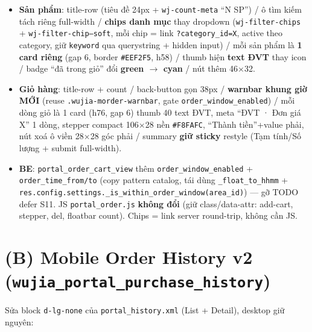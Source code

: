 \begin{itemize}
  \item \textbf{Sản phẩm}: title-row (tiêu đề 24px + \texttt{wj-count-meta} ``N SP'') / ô tìm kiếm
        tách riêng full-width / \textbf{chips danh mục} thay dropdown (\texttt{wj-filter-chips} +
        \texttt{wj-filter-chip--soft}, mỗi chip = link \texttt{?category\_id=X}, active theo
        category, giữ \texttt{keyword} qua querystring + hidden input) / mỗi sản phẩm là
        \textbf{1 card riêng} (gap 6, border \texttt{\#EEF2F5}, h58) / thumb hiện \textbf{text ĐVT}
        thay icon / badge ``đã trong giỏ'' đổi \textbf{green \(\rightarrow\) cyan} / nút thêm 46×32.
  \item \textbf{Giỏ hàng}: title-row + count / back-button gọn 38px / \textbf{warnbar khung giờ MỚI}
        (reuse \texttt{.wujia-morder-warnbar}, gate \texttt{order\_window\_enabled}) / mỗi dòng giỏ
        là 1 card (h76, gap 6) thumb 40 text ĐVT, meta ``ĐVT · Đơn giá X'' 1 dòng, stepper compact
        106×28 nền \texttt{\#F8FAFC}, ``Thành tiền''+value phải, nút xoá ô viền 28×28 góc phải /
        summary \textbf{giữ sticky} restyle (Tạm tính/Số lượng + submit full-width).
  \item \textbf{BE}: \texttt{portal\_order\_cart\_view} thêm \texttt{order\_window\_enabled} +
        \texttt{order\_time\_from/to} (copy pattern catalog, tái dùng \texttt{\_float\_to\_hhmm} +
        \texttt{res.config.settings.\_is\_within\_order\_window(area\_id)}) --- gỡ TODO defer S11.
        JS \texttt{portal\_order.js} \textbf{không đổi} (giữ class/data-attr: add-cart, stepper,
        del, floatbar count). Chips = link server round-trip, không cần JS.
\end{itemize}

\section{(B) Mobile Order History v2 (\texttt{wujia\_portal\_purchase\_history})}

Sửa block \texttt{d-lg-none} của \texttt{portal\_history.xml} (List + Detail), desktop giữ nguyên:

